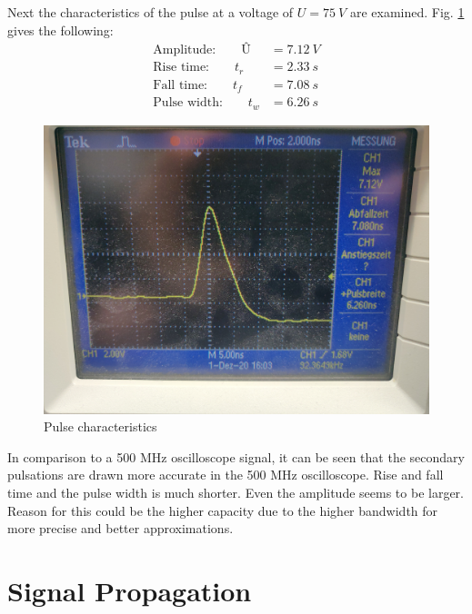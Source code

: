 Next the characteristics of the pulse at a voltage of $ U=\SI{75}{V} $ are examined. Fig. \ref{fig:pulsuntersuchung} gives the following:
\begin{align}
\text{Amplitude:}\qquad Û&=\SI{7.12}{V}\\
\text{Rise time:}\qquad t_r&=\SI{2.33}{s}\\
\text{Fall time:}\qquad t_f&=\SI{7.08}{s}\\
\text{Pulse width:}\qquad t_w&=\SI{6.26}{s}
\end{align}
\begin{figure}[H]
 \centering
 \includegraphics[width=0.7\linewidth]{messdaten/Pulsuntersuchung}
 \caption[Pulse characteristics]{Pulse characteristics}
 \label{fig:pulsuntersuchung}
\end{figure}
In comparison to a 500 MHz oscilloscope signal, it can be seen that the secondary pulsations are drawn more accurate in the 500 MHz oscilloscope. Rise and fall time and the pulse width is much shorter. Even the amplitude seems to be larger. Reason for this could be the higher capacity due to the higher bandwidth for more precise and better approximations.

\section{Signal Propagation}

